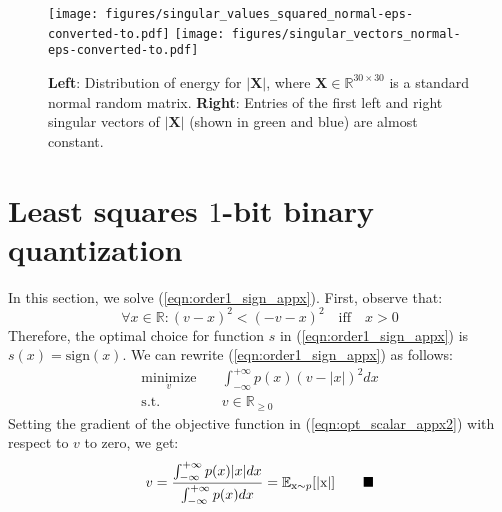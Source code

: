\documentclass[10pt,twocolumn,letterpaper]{article}
\def\rx{{\textnormal{x}}}
\def\mX{{\bm{X}}}
\newcommand{\R}{\mathbb{R}}
\newcommand{\E}{\mathbb{E}}
\newcommand{\qed}{\blacksquare}
\begin{document}
\begin{figure}[htb!]
\begin{center}
\texttt{[image: figures/singular\_values\_squared\_normal-eps-converted-to.pdf]}
\texttt{[image: figures/singular\_vectors\_normal-eps-converted-to.pdf]}
\end{center}
\caption{{\bf Left}: Distribution of energy for $|\mX| $, where $\mX \in \R^{30 \times 30}$ is a standard normal random matrix. {\bf Right}: Entries of the first left and right singular vectors of $|\mX|$ (shown in green and blue) are almost constant.}
\label{fig:svd_normal}
\end{figure}

\section{Least squares $1$-bit binary quantization} \label{sec:opt_scalar_appx}
In this section, we solve (\ref{eqn:order1_sign_appx}). First, observe that:
\begin{equation}
\forall x \in \R: (v-x)^2 < (-v-x)^2 \quad \text{iff} \quad x>0
\end{equation}
Therefore, the optimal choice for function $s$ in (\ref{eqn:order1_sign_appx}) is $s(x)=\text{sign}(x)$. We can rewrite (\ref{eqn:order1_sign_appx}) as follows:
\begin{equation}\label{eqn:opt_scalar_appx2}
\begin{aligned}
\underset{v}{\text{minimize}} \quad & \int_{-\infty}^{+\infty} p(x)(v - |x|)^2 dx\\
\text{s.t.} \quad & v \in \R_{\ge 0}
\end{aligned}
\end{equation}
Setting the gradient of the objective function in (\ref{eqn:opt_scalar_appx2}) with respect to $v$ to zero, we get:
\begin{equation}
v = \frac{ \int_{-\infty}^{+\infty} p(x) |x| dx }{\int_{-\infty}^{+\infty} p(x) dx} = \E_{\rx\sim p} [ |\rx| ] \quad\quad\qed
\end{equation}

\end{document}
